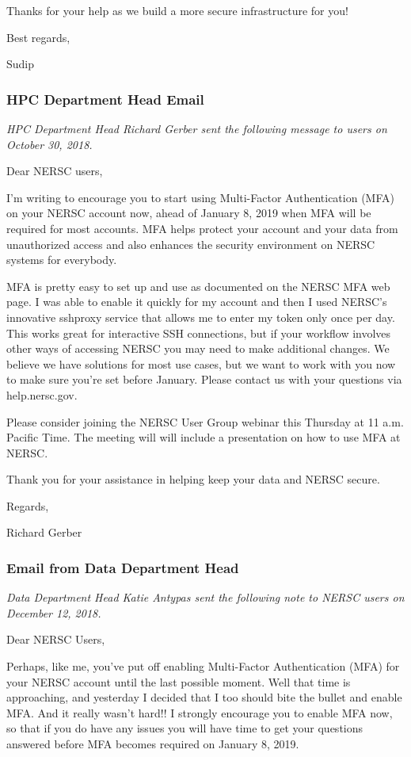 \documentclass[sigconf,review]{acmart}
\begin{document}
Thanks for your help as we build a more secure infrastructure for you!

Best regards,

Sudip

\subsubsection{HPC Department Head Email}

{\em HPC Department Head Richard Gerber sent the following message to users
on October 30, 2018.}

Dear NERSC users,

I’m writing to encourage you to start using Multi-Factor Authentication (MFA) on your NERSC account now, ahead of January 8, 2019 when MFA will be required for most accounts. MFA helps protect your account and your data from unauthorized access and also enhances the security environment on NERSC systems for everybody. 

MFA is pretty easy to set up and use as documented on the NERSC MFA web page. I was able to enable it quickly for my account and then I used NERSC’s innovative sshproxy service that allows me to enter my token only once per day. This works great for interactive SSH connections, but if your workflow involves other ways of accessing NERSC you may need to make additional changes. We believe we have solutions for most use cases, but we want to work with you now to make sure you’re set before January. Please contact us with your questions via help.nersc.gov. 

Please consider joining the NERSC User Group webinar this Thursday at 11 a.m. Pacific Time. The meeting will will include a presentation on how to use MFA at NERSC.  

Thank you for your assistance in helping keep your data and NERSC secure.


Regards,

Richard Gerber

\subsubsection{Email from Data Department Head}
{\em Data Department Head Katie Antypas sent the following note to NERSC users
on December 12, 2018.}

Dear NERSC Users,

Perhaps, like me, you've put off enabling Multi-Factor Authentication (MFA) for your NERSC account until the last possible moment.  Well that time is approaching, and yesterday I decided that I too should bite the bullet and enable MFA.  And it really wasn't hard!!  I strongly encourage you to enable MFA now, so that if you do have any issues you will have time to get your questions answered before MFA becomes required on January 8, 2019.  
\end{document}

